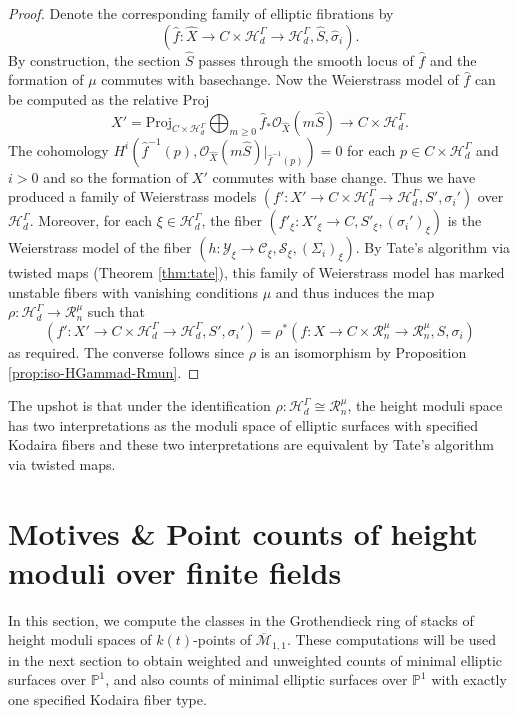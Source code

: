 \documentclass[a4paper,12pt]{amsart}
\theoremstyle{definition}
\newcommand{\bP}{\mathbb{P}}
\newcommand{\cY}{\mathcal{Y}}
\newcommand{\cO}{\mathcal{O}}
\newcommand{\cC}{\mathcal{C}}
\newcommand{\cH}{\mathcal{H}}
\newcommand{\cR}{\mathcal{R}}
\newcommand{\cM}{\mathcal{M}}
\newcommand{\cS}{\mathcal{S}}
\begin{document}
\begin{proof}
		Denote the corresponding family of elliptic fibrations by
		$$
		(\hat{f} : \hat{X} \to C \times \cH^\Gamma_d \to \cH^\Gamma_d, \hat{S}, \hat{\sigma}_i). 
		$$
		By construction, the section $\hat{S}$ passes through the smooth locus of $\hat{f}$ and the formation of $\mu$ commutes with basechange. Now the Weierstrass model of $\hat{f}$ can be computed as the relative Proj 
		$$
		X' = \mathrm{Proj}_{C \times \cH^\Gamma_d} \bigoplus_{m \geq 0} \hat{f}_*\cO_{\hat{X}}(m\hat{S}) \to C \times \cH^\Gamma_d. 
		$$
		The cohomology $H^i\left(\hat{f}^{-1}(p), \cO_{\hat{X}}(m\hat{S})\big|_{\hat{f}^{-1}(p)}\right) = 0$ for each $p \in C \times \cH^\Gamma_d$ and $i > 0$ and so the formation of $X'$ commutes with base change. Thus we have produced a family of Weierstrass models $(f' : X' \to C \times \cH^\Gamma_d \to \cH^\Gamma_d, S', \sigma_i')$ over $\cH^\Gamma_d$. Moreover, for each $\xi \in \cH^\Gamma_d$, the fiber $(f'_\xi : X'_{\xi} \to C, S'_\xi, (\sigma_i')_{\xi})$ is the Weierstrass model of the fiber $(h : \cY_\xi \to \cC_\xi, \cS_\xi, (\Sigma_i)_\xi)$. By Tate's algorithm via twisted maps (Theorem \ref{thm:tate}), this family of Weierstrass model has marked unstable fibers with vanishing conditions $\mu$ and thus induces the map $\rho : \cH^\Gamma_d \to \cR^\mu_n$ such that
		$$
		(f' : X' \to C \times \cH^\Gamma_d \to \cH^\Gamma_d, S', \sigma_i') = \rho^*(f : X \to C \times \cR^\mu_n \to \cR^\mu_n, S, \sigma_i) 
		$$
		as required. The converse follows since $\rho$ is an isomorphism by Proposition \ref{prop:iso-HGammad-Rmun}. 
	\end{proof}
	
	The upshot is that under the identification $\rho : \cH^\Gamma_d \cong \cR^\mu_n$, the height moduli space has two interpretations as the moduli space of elliptic surfaces with specified Kodaira fibers and these two interpretations are equivalent by Tate's algorithm via twisted maps.
	
	
	
	
	
	\section{Motives \& Point counts of height moduli over finite fields}
	\label{sec:motive_ptcts}
	
	In this section, we compute the classes in the Grothendieck ring of stacks of height moduli spaces of $k(t)$-points of $\overline{\cM}_{1,1}$. These computations will be used in the next section to obtain weighted and unweighted counts of minimal elliptic surfaces over $\bP^1$, and also counts of minimal elliptic surfaces over $\bP^1$ with exactly one specified Kodaira fiber type.
	
\end{document}
